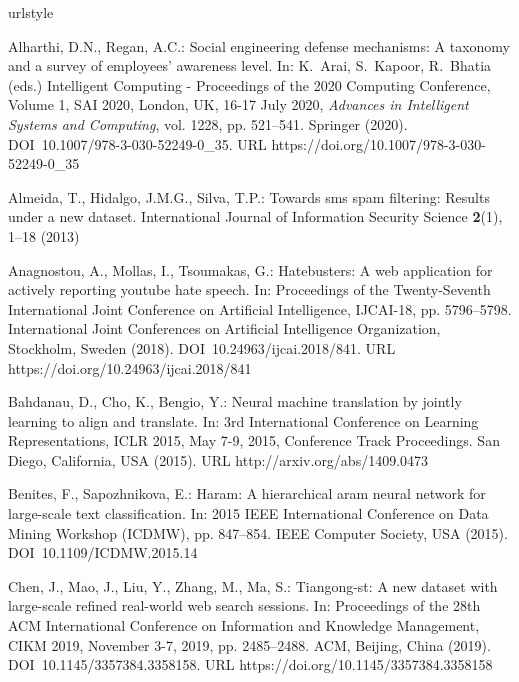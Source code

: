 \documentclass{article}
\begin{document}

\begin{thebibliography}{10}
\providecommand{\url}[1]{{#1}}
\providecommand{\urlprefix}{URL }
\expandafter\ifx\csname urlstyle\endcsname\relax
  \providecommand{\doi}[1]{DOI~\discretionary{}{}{}#1}\else
  \providecommand{\doi}{DOI~\discretionary{}{}{}\begingroup
  \urlstyle{rm}\Url}\fi

Alharthi, D.N., Regan, A.C.: Social engineering defense mechanisms: {A}
  taxonomy and a survey of employees' awareness level.
\newblock In: K.~Arai, S.~Kapoor, R.~Bhatia (eds.) Intelligent Computing -
  Proceedings of the 2020 Computing Conference, Volume 1, {SAI} 2020, London,
  UK, 16-17 July 2020, \emph{Advances in Intelligent Systems and Computing},
  vol. 1228, pp. 521--541. Springer (2020).
\newblock \doi{10.1007/978-3-030-52249-0\_35}.
\newblock \urlprefix\url{https://doi.org/10.1007/978-3-030-52249-0\_35}

Almeida, T., Hidalgo, J.M.G., Silva, T.P.: Towards sms spam filtering: Results
  under a new dataset.
\newblock International Journal of Information Security Science \textbf{2}(1),
  1--18 (2013)

Anagnostou, A., Mollas, I., Tsoumakas, G.: Hatebusters: A web application for
  actively reporting youtube hate speech.
\newblock In: Proceedings of the Twenty-Seventh International Joint Conference
  on Artificial Intelligence, {IJCAI-18}, pp. 5796--5798. International Joint
  Conferences on Artificial Intelligence Organization, Stockholm, Sweden
  (2018).
\newblock \doi{10.24963/ijcai.2018/841}.
\newblock \urlprefix\url{https://doi.org/10.24963/ijcai.2018/841}

Bahdanau, D., Cho, K., Bengio, Y.: Neural machine translation by jointly
  learning to align and translate.
\newblock In: 3rd International Conference on Learning Representations, {ICLR}
  2015, May 7-9, 2015, Conference Track Proceedings. San Diego, California, USA
  (2015).
\newblock \urlprefix\url{http://arxiv.org/abs/1409.0473}

Benites, F., Sapozhnikova, E.: Haram: A hierarchical aram neural network for
  large-scale text classification.
\newblock In: 2015 IEEE International Conference on Data Mining Workshop
  (ICDMW), pp. 847--854. IEEE Computer Society, USA (2015).
\newblock \doi{10.1109/ICDMW.2015.14}

Chen, J., Mao, J., Liu, Y., Zhang, M., Ma, S.: Tiangong-st: {A} new dataset
  with large-scale refined real-world web search sessions.
\newblock In: Proceedings of the 28th {ACM} International Conference on
  Information and Knowledge Management, {CIKM} 2019, November 3-7, 2019, pp.
  2485--2488. {ACM}, Beijing, China (2019).
\newblock \doi{10.1145/3357384.3358158}.
\newblock \urlprefix\url{https://doi.org/10.1145/3357384.3358158}


\end{thebibliography}
\end{document}
